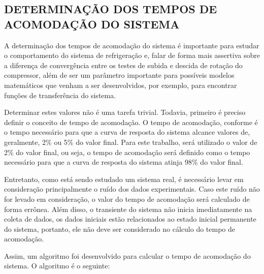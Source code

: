 \subsection{\MakeUppercase{Determinação dos Tempos de Acomodação do Sistema}} \label{subsec:Tempo de Acomodação do Sistema}

A determinação dos tempos de acomodação do sistema é importante para estudar o comportamento do sistema de refrigeração e, falar
 de forma mais assertiva sobre a diferença de convergência entre os testes de subida e descida de rotação do compressor, além de ser um parâmetro importante para possíveis modelos matemáticos que venham a ser desenvolvidos, por exemplo, para encontrar funções de transferência do sistema. 

Determinar estes valores não é uma tarefa trivial. Todavia, primeiro é preciso definir o conceito de tempo de acomodação. O tempo de acomodação, conforme \textcite{ogataControle} é o tempo necessário para que a curva de resposta do sistema alcance valores de, geralmente, 2\% ou 5\% do valor final. Para este trabalho, será utilizado o valor de 2\% do valor final, ou seja, o tempo de acomodação será definido como o tempo necessário para que a curva de resposta do sistema atinja 98\% do valor final.

Entretanto, como está sendo estudado um sistema real, é necessário levar em consideração principalmente o ruído dos dados experimentais. Caso este ruído não for levado em consideração, o valor do tempo de acomodação será calculado de forma errônea. Além disso, o transiente do sistema não inicia imediatamente na coleta de dados, os dados iniciais estão relacionados ao estado inicial permanente do sistema, portanto, ele não deve ser considerado no cálculo do tempo de acomodação. 

Assim, um algoritmo foi desenvolvido para calcular o tempo de acomodação do sistema. O algoritmo é o seguinte:

